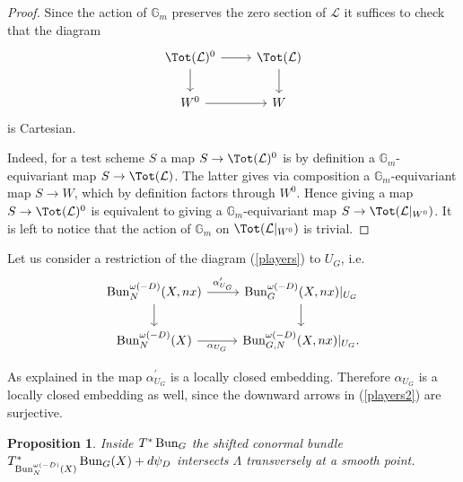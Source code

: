 \documentclass[9pt]{amsart}
\newcommand{\red}[1]{\leavevmode{\color{red}{#1}}}
\newcommand{\bG}{{\mathbb G}}
\newcommand{\cL}{{\mathcal L}}
\newtheorem{pr}[subsubsection]{Proposition}
\newtheorem{lm}[subsubsection]{Lemma}
\numberwithin{equation}{section}
\begin{document}
\begin{proof}
	Since the action of $\bG_m$ preserves the zero section of $\cL$ it suffices to check that the diagram 
	\[
	\begin{tikzcd}
	\Tot(\cL)^{0}\ar[r, rightarrow, ""']\ar[d, rightarrow, ""']&   	\Tot(\cL)\ar[d, rightarrow, ""']  \\
	W^{0}\ar[r, rightarrow, ""']&   W
	\end{tikzcd}
	\]
	is Cartesian.
	
	Indeed, for a test scheme $S$ a map $S \rightarrow 	\Tot(\cL)^{0}$ is by definition a $\bG_m$-equivariant map $S \rightarrow 	\Tot(\cL)$. The latter gives via composition a $\bG_m$-equivariant map $S \rightarrow W$, which by definition factors through $W^0$. Hence giving a map $S \rightarrow 	\Tot(\cL)^{0}$ is equivalent to giving a $\bG_m$-equivariant map $S \rightarrow \Tot(\cL|_{W^0})$. It is left to notice that the action of $\bG_m$ on $\Tot(\cL|_{W^0})$ is trivial.
\end{proof}



Let us consider a restriction of the diagram (\ref{players}) to $U_G$, i.e. 
\begin{equation}\label{players2}
\begin{tikzcd}
\Bun_{N}^{\omega(-D)}(X, nx)\ar[r, rightarrow, "\alpha^{\prime}_{U_G}"]\ar[d, rightarrow, ""']&   	\Bun_{G}^{\omega(-D)}(X, nx)|_{U_G}\ar[d, rightarrow, ""']  \\
\Bun_{N}^{\omega(-D)}(X)\ar[r, rightarrow, "\alpha_{U_G}"']&   \Bun_{G, N}^{\omega(-D)}(X, nx)|_{U_G}.
\end{tikzcd}
\end{equation}

As explained in \cite[(3.12)]{NT} the map $\alpha^{\prime}_{U_G}$ is a locally closed embedding. Therefore $\alpha_{U_G}$ is a locally closed embedding as well, since the downward arrows in (\ref{players2}) are surjective. 






\begin{pr}\label{transversal intersection 1}
	Inside $T^*\operatorname{{Bun}}_G$ the shifted conormal bundle $T^*_{\operatorname{{Bun}}_N^{\omega(-D)}(X)} \operatorname{{Bun}}_G(X) + d\psi_D$ intersects $\Lambda$ transversely at a smooth point.
\end{pr}
\end{document}

